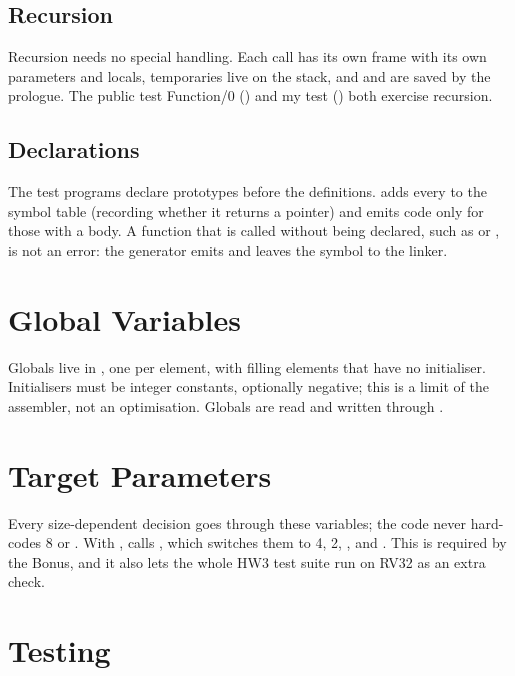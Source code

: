 \documentclass[12pt]{article}
\begin{document}
\subsection{Recursion}

Recursion needs no special handling. Each call has its own frame with its own parameters and locals,
temporaries live on the stack, and  and  are saved by the prologue. The public test
Function/0 () and my test  () both exercise recursion.

\subsection{Declarations}

The test programs declare prototypes before the definitions.  adds every  to
the symbol table (recording whether it returns a pointer) and emits code only for those with a body. A
function that is called without being declared, such as  or , is not an error:
the generator emits  and leaves the symbol to the linker.

\section{Global Variables}


Globals live in , one  per element, with  filling elements that have no
initialiser. Initialisers must be integer constants, optionally negative; this is a limit of the assembler,
not an optimisation. Globals are read and written through .

\section{Target Parameters}


Every size-dependent decision goes through these variables; the code never hard-codes 8 or .
With ,  calls , which switches them to 4, 2, ,  and
. This is required by the Bonus, and it also lets the whole HW3 test suite run on RV32 as an extra
check.

\section{Testing}
\end{document}
